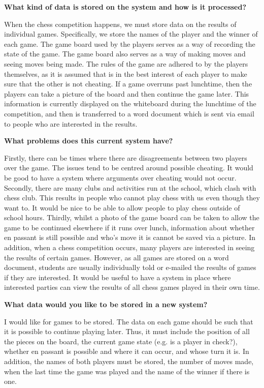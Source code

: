 \textbf{What kind of data is stored on the system and how is it processed?}

When the chess competition happens, we must store data on the results of individual games. Specifically, we store the names of the player and the winner of each game. The game board used by the players serves as a way of recording the state of the game. The game board also serves as a way of making moves and seeing moves being made. The rules of the game are adhered to by the players themselves, as it is assumed that is in the best interest of each player to make sure that the other is not cheating. If a game overruns past lunchtime, then the players can take a picture of the board and then continue the game later. This information is currently displayed on the whiteboard during the lunchtime of the competition, and then is transferred to a word document which is sent via email to people who are interested in the results. 

\textbf{What problems does this current system have?}

Firstly, there can be times where there are disagreements between two players over the game. The issues tend to be centred around possible cheating. It would be good to have a system where arguments over cheating would not occur. Secondly, there are many clubs and activities run at the school, which clash with chess club. This results in people who cannot play chess with us even though they want to. It would be nice to be able to allow people to play chess outside of school hours. Thirdly, whilst a photo of the game board can be taken to allow the game to be continued elsewhere if it runs over lunch, information about whether en passant is still possible and who’s move it is cannot be saved via a picture.  In addition, when a chess competition occurs, many players are interested in seeing the results of certain games. However, as all games are stored on a word document, students are usually individually told or e-mailed the results of games if they are interested. It would be useful to have a system in place where interested parties can view the results of all chess games played in their own time.

\textbf{What data would you like to be stored in a new system?}

I would like for games to be stored. The data on each game should be such that it is possible to continue playing later. Thus, it must include the position of all the pieces on the board, the current game state (e.g. is a player in check?), whether en passant is possible and where it can occur, and whose turn it is. In addition, the names of both players must be stored, the number of moves made, when the last time the game was played and the name of the winner if there is one. 

